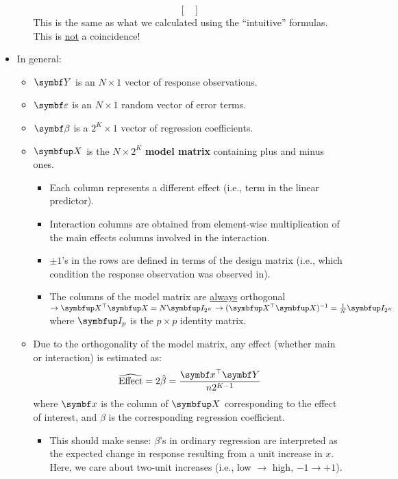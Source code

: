 \begin{itemize}
\begin{itemize}
\[\begin{bmatrix}
                              \end{bmatrix} \]
                        This is the same as what we calculated using the ``intuitive'' formulas. This is \underline{not} a coincidence!
            \end{itemize}
      \item In general:
            \begin{itemize}
                  \item $ \RandomVector{Y} $ is an $ N\times 1 $ vector of response observations.
                  \item $ \RandomVector{\varepsilon} $ is an $ N\times 1 $ random vector of error terms.
                  \item $ \Vector{\beta} $ is a $ 2^K\times 1 $ vector of regression coefficients.
                  \item $ \Matrix{X} $ is the $ N\times 2^K $ \textbf{model matrix} containing plus and minus ones.
                        \begin{itemize}
                              \item Each column represents a different effect (i.e., term in the linear predictor).
                              \item Interaction columns are obtained from element-wise multiplication of the main effects columns involved in the interaction.
                              \item $ \pm 1 $'s in the rows are defined in terms of the design matrix (i.e., which condition the response observation was observed in).
                              \item The columns of the model matrix are \underline{always} orthogonal $ \rightarrow \Matrix{X}^\top \Matrix{X}=N\Matrix{I}_{2^K}
                                          \rightarrow (\Matrix{X}^\top \Matrix{X})^{-1}=\frac{1}{N}\Matrix{I}_{2^K}$ where $ \Matrix{I}_p $ is the $ p\times p $
                                    identity matrix.
                        \end{itemize}
                  \item Due to the orthogonality of the model matrix, any effect (whether main or interaction) is estimated as:
                        \[ \widehat{\text{Effect}}=2\hat{\beta}=\frac{\Vector{x}^\top \RandomVector{Y}}{n 2^{K-1}}  \]
                        where $ \Vector{x} $ is the column of $ \Matrix{X} $ corresponding to the effect of interest, and $ \beta $ is the corresponding
                        regression coefficient.
                        \begin{itemize}[*]
                              \item This should make sense: $ \beta $'s in ordinary regression are interpreted as the expected change in response
                                    resulting from a unit increase in $ x $. Here, we care about two-unit increases (i.e., low $\rightarrow $ high, $-1\rightarrow +1$).
                        \end{itemize}
            \end{itemize}
\end{itemize}
